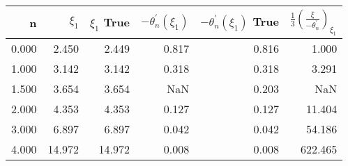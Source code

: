 \begin{tabular}{rrrrrr}
\toprule
    n &  $\xi_1$ &  $\xi_1$ True &  $-\theta_n^\prime(\xi_1)$ &  $-\theta_n^\prime(\xi_1)$ True &  $\frac{1}{3}\left(\frac{\xi}{-\theta_n^\prime}\right)_{\xi_1}$ \\
\midrule
0.000 &    2.450 &         2.449 &                      0.817 &                           0.816 &                                              1.000 \\
1.000 &    3.142 &         3.142 &                      0.318 &                           0.318 &                                              3.291 \\
1.500 &    3.654 &         3.654 &                        NaN &                           0.203 &                                                NaN \\
2.000 &    4.353 &         4.353 &                      0.127 &                           0.127 &                                             11.404 \\
3.000 &    6.897 &         6.897 &                      0.042 &                           0.042 &                                             54.186 \\
4.000 &   14.972 &        14.972 &                      0.008 &                           0.008 &                                            622.465 \\
\bottomrule
\end{tabular}
